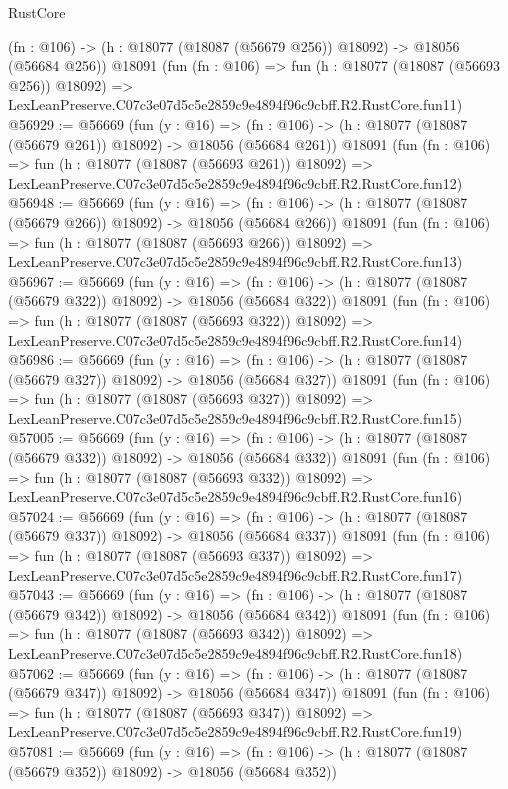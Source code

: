 \begin{lexlean}{RustCore}
\begin{coremodule}
    (fn : @106) -> (h : @18077 (@18087 (@56679 @256)) @18092) -> @18056 (@56684 @256))
    @18091
    (fun (fn : @106) =>
    fun (h : @18077 (@18087 (@56693 @256)) @18092) =>
    LexLeanPreserve.C07c3e07d5c5e2859c9e4894f96c9cbff.R2.RustCore.fun11)
@56929 := @56669
    (fun (y : @16) =>
    (fn : @106) -> (h : @18077 (@18087 (@56679 @261)) @18092) -> @18056 (@56684 @261))
    @18091
    (fun (fn : @106) =>
    fun (h : @18077 (@18087 (@56693 @261)) @18092) =>
    LexLeanPreserve.C07c3e07d5c5e2859c9e4894f96c9cbff.R2.RustCore.fun12)
@56948 := @56669
    (fun (y : @16) =>
    (fn : @106) -> (h : @18077 (@18087 (@56679 @266)) @18092) -> @18056 (@56684 @266))
    @18091
    (fun (fn : @106) =>
    fun (h : @18077 (@18087 (@56693 @266)) @18092) =>
    LexLeanPreserve.C07c3e07d5c5e2859c9e4894f96c9cbff.R2.RustCore.fun13)
@56967 := @56669
    (fun (y : @16) =>
    (fn : @106) -> (h : @18077 (@18087 (@56679 @322)) @18092) -> @18056 (@56684 @322))
    @18091
    (fun (fn : @106) =>
    fun (h : @18077 (@18087 (@56693 @322)) @18092) =>
    LexLeanPreserve.C07c3e07d5c5e2859c9e4894f96c9cbff.R2.RustCore.fun14)
@56986 := @56669
    (fun (y : @16) =>
    (fn : @106) -> (h : @18077 (@18087 (@56679 @327)) @18092) -> @18056 (@56684 @327))
    @18091
    (fun (fn : @106) =>
    fun (h : @18077 (@18087 (@56693 @327)) @18092) =>
    LexLeanPreserve.C07c3e07d5c5e2859c9e4894f96c9cbff.R2.RustCore.fun15)
@57005 := @56669
    (fun (y : @16) =>
    (fn : @106) -> (h : @18077 (@18087 (@56679 @332)) @18092) -> @18056 (@56684 @332))
    @18091
    (fun (fn : @106) =>
    fun (h : @18077 (@18087 (@56693 @332)) @18092) =>
    LexLeanPreserve.C07c3e07d5c5e2859c9e4894f96c9cbff.R2.RustCore.fun16)
@57024 := @56669
    (fun (y : @16) =>
    (fn : @106) -> (h : @18077 (@18087 (@56679 @337)) @18092) -> @18056 (@56684 @337))
    @18091
    (fun (fn : @106) =>
    fun (h : @18077 (@18087 (@56693 @337)) @18092) =>
    LexLeanPreserve.C07c3e07d5c5e2859c9e4894f96c9cbff.R2.RustCore.fun17)
@57043 := @56669
    (fun (y : @16) =>
    (fn : @106) -> (h : @18077 (@18087 (@56679 @342)) @18092) -> @18056 (@56684 @342))
    @18091
    (fun (fn : @106) =>
    fun (h : @18077 (@18087 (@56693 @342)) @18092) =>
    LexLeanPreserve.C07c3e07d5c5e2859c9e4894f96c9cbff.R2.RustCore.fun18)
@57062 := @56669
    (fun (y : @16) =>
    (fn : @106) -> (h : @18077 (@18087 (@56679 @347)) @18092) -> @18056 (@56684 @347))
    @18091
    (fun (fn : @106) =>
    fun (h : @18077 (@18087 (@56693 @347)) @18092) =>
    LexLeanPreserve.C07c3e07d5c5e2859c9e4894f96c9cbff.R2.RustCore.fun19)
@57081 := @56669
    (fun (y : @16) =>
    (fn : @106) -> (h : @18077 (@18087 (@56679 @352)) @18092) -> @18056 (@56684 @352))

\end{coremodule}
\end{lexlean}

